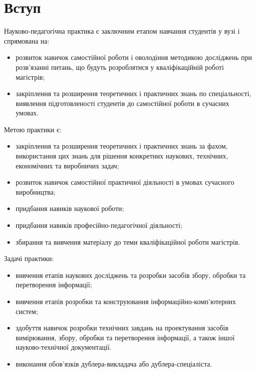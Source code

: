 \documentclass[a4paper,ukrainian,utf8,nocolumnsxix,floatsection]{eskdtext}
\let\stdsection\section
\renewcommand\section{\clearpage\stdsection}
\newcommand{\sectionnonum}[1]{\section*{#1}\addcontentsline{toc}{section}{#1}}
\begin{document}


{}


\tableofcontents


\sectionnonum{Вступ}

Науково-педагогічна практика є заключним етапом навчання студентів у вузі і спрямована на:
\begin{itemize}
	\item розвиток навичок самостійної роботи і оволодіння методикою досліджень при розв’язанні питань, що будуть розроблятися у кваліфікаційній роботі магістрів;
	\item закріплення та розширення теоретичних і практичних знань по спеціальності, виявлення підготовленості студентів до самостійної роботи в сучасних умовах.
\end{itemize}

Метою практики є:
\begin{itemize}
	\item закріплення та розширення теоретичних і практичних знань за фахом, використання цих знань для рішення конкретних наукових, технічних, економічних та виробничих задач; 
	\item розвиток навичок самостійної практичної діяльності в умовах сучасного виробництва;
	\item придбання навиків наукової роботи;
	\item придбання навиків професійно-педагогічної діяльності;
	\item збирання та вивчення матеріалу до теми кваліфікаційної роботи магістрів.
\end{itemize}

Задачі практики:
\begin{itemize}
	\item вивчення етапів наукових досліджень та розробки засобів збору, обробки та перетворення інформації;
	\item вивчення етапів розробки та конструювання інформаційно-комп’ютерних систем;
	\item здобуття навичок розробки технічних завдань на проектування засобів вимірювання, збору, обробки та перетворення інформації, а також іншої науково-технічної документації.
	\item виконання обов’язків дублера-викладача або дублера-спеціаліста.
\end{itemize}
\end{document}
